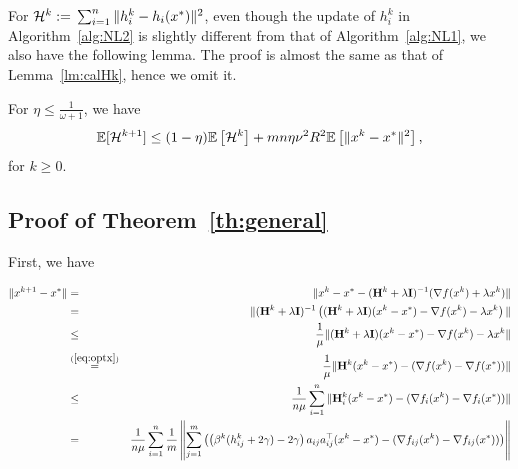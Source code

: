\documentclass[12pt]{article}
\newcommand{\eqdef}{\; { := }\;}
\newcommand{\ExpBr}[1]{\mathbb{E}\left[#1\right]}
\newcommand{\newalpha}{h}
\newcommand{\mH}{\mathbf{H}}
\newcommand{\mI}{\mathbf{I}}
\begin{document}
For ${\cal H}^k \eqdef \sum_{i=1}^n \|h_i^k - \newalpha_i(x^*)\|^2$, even though the update of $h_i^k$ in Algorithm~\ref{alg:NL2} is slightly different from that of Algorithm~\ref{alg:NL1}, we also have the following lemma. The proof is almost the same as that of Lemma~\ref{lm:calHk}, hence we omit it. 

\begin{lemma}\label{lm:calHk-2} For $\eta \leq \frac{1}{\omega+1}$, we have 
	$$
	\mathbb{E}[{\cal H}^{k+1}] \leq  (1-\eta) \ExpBr{{\cal H}^k} + m n \eta \nu^2 R^2 \ExpBr{\|x^k - x^*\|^2}, 
	$$
	for $k\geq 0$. 
\end{lemma}


\subsection{Proof of Theorem~\ref{th:general}}


First, we have 

\begin{eqnarray*}
	\|x^{k+1} - x^*\| &=& \| x^k - x^* - (\mH^k + \lambda \mI)^{-1} (\nabla f(x^k) + \lambda x^k) \| \\
	&=& \|(\mH^k + \lambda \mI)^{-1} \left(  (\mH^k + \lambda \mI)(x^k - x^*) - \nabla f(x^k) - \lambda x^k  \right) \| \\ 
	&\leq& \frac{1}{\mu} \|  (\mH^k + \lambda \mI)(x^k - x^*) - \nabla f(x^k) - \lambda x^k  \| \\ 
	&\overset{(\ref{eq:optx})}{=}& \frac{1}{\mu} \| \mH^k (x^k - x^*) - (\nabla f(x^k) - \nabla f(x^*)) \| \\ 
	&\leq& \frac{1}{n \mu} \sum_{i=1}^n \| \mH_i^k (x^k - x^*) - (\nabla f_i(x^k) - \nabla f_i(x^*)) \| \\
	&=& \frac{1}{n \mu} \sum_{i=1}^n \frac{1}{m} \left\|  \sum_{j=1}^{m} \left( \left( \beta^k (h_{ij}^k + 2\gamma) - 2\gamma \right)a_{ij}a_{ij}^\top (x^k - x^*) -  (\nabla f_{ij}(x^k) - \nabla f_{ij}(x^*)) \right)   \right\| 
\end{eqnarray*}
\end{document}
